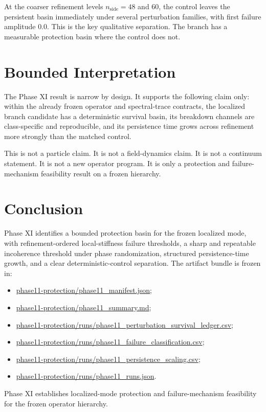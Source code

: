 \documentclass[11pt]{article}
\begin{document}
At the coarser refinement levels $n_{\mathrm{side}} = 48$ and $60$, the control leaves the persistent basin immediately under several perturbation families, with first failure amplitude $0.0$. This is the key qualitative separation. The branch has a measurable protection basin where the control does not.

\section{Bounded Interpretation}

The Phase XI result is narrow by design. It supports the following claim only: within the already frozen operator and spectral-trace contracts, the localized branch candidate has a deterministic survival basin, its breakdown channels are class-specific and reproducible, and its persistence time grows across refinement more strongly than the matched control.

This is not a particle claim. It is not a field-dynamics claim. It is not a continuum statement. It is not a new operator program. It is only a protection and failure-mechanism feasibility result on a frozen hierarchy.

\section{Conclusion}

Phase XI identifies a bounded protection basin for the frozen localized mode, with refinement-ordered local-stiffness failure thresholds, a sharp and repeatable incoherence threshold under phase randomization, structured persistence-time growth, and a clear deterministic-control separation. The artifact bundle is frozen in:
\begin{itemize}
\item \url{phase11-protection/phase11_manifest.json};
\item \url{phase11-protection/phase11_summary.md};
\item \url{phase11-protection/runs/phase11_perturbation_survival_ledger.csv};
\item \url{phase11-protection/runs/phase11_failure_classification.csv};
\item \url{phase11-protection/runs/phase11_persistence_scaling.csv};
\item \url{phase11-protection/runs/phase11_runs.json}.
\end{itemize}

Phase XI establishes localized-mode protection and failure-mechanism feasibility for the frozen operator hierarchy.
\end{document}
